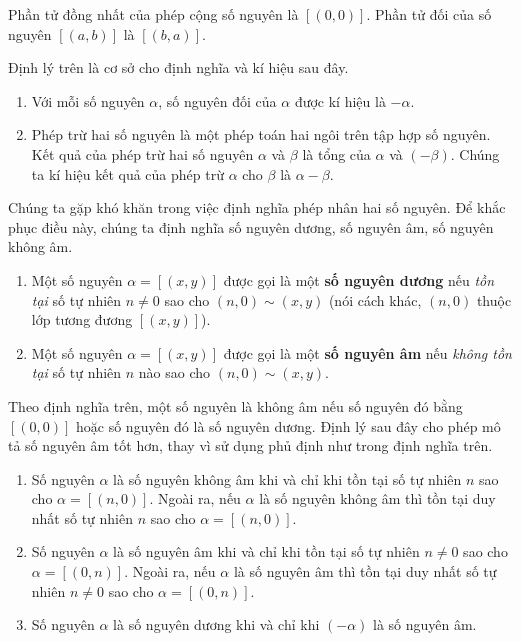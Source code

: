 Phần tử đồng nhất của phép cộng số nguyên là $[(0,0)]$. Phần tử đối của số nguyên $[(a, b)]$ là $[(b, a)]$.

Định lý trên là cơ sở cho định nghĩa và kí hiệu sau đây.
\begin{definition}
    \begin{enumerate}[label={(\roman*)}]
        \item Với mỗi số nguyên $\alpha$, số nguyên đối của $\alpha$ được kí hiệu là $-\alpha$.
        \item Phép trừ hai số nguyên là một phép toán hai ngôi trên tập hợp số nguyên. Kết quả của phép trừ hai số nguyên $\alpha$ và $\beta$ là tổng của $\alpha$ và $(-\beta)$. Chúng ta kí hiệu kết quả của phép trừ $\alpha$ cho $\beta$ là $\alpha - \beta$.
    \end{enumerate}
\end{definition}

Chúng ta gặp khó khăn trong việc định nghĩa phép nhân hai số nguyên. Để khắc phục điều này, chúng ta định nghĩa số nguyên dương, số nguyên âm, số nguyên không âm.
\begin{definition}
    \begin{enumerate}[label={(\roman*)}]
        \item Một số nguyên $\alpha = [(x, y)]$ được gọi là một \textbf{số nguyên dương} nếu \textit{tồn tại} số tự nhiên $n\ne 0$ sao cho $(n, 0)\sim (x, y)$ (nói cách khác, $(n, 0)$ thuộc lớp tương đương $[(x, y)]$).
        \item Một số nguyên $\alpha = [(x, y)]$ được gọi là một \textbf{số nguyên âm} nếu \textit{không tồn tại} số tự nhiên $n$ nào sao cho $(n, 0)\sim (x, y)$.
    \end{enumerate}
\end{definition}

Theo định nghĩa trên, một số nguyên là không âm nếu số nguyên đó bằng $[(0, 0)]$ hoặc số nguyên đó là số nguyên dương. Định lý sau đây cho phép mô tả số nguyên âm tốt hơn, thay vì sử dụng phủ định như trong định nghĩa trên.
\begin{theorem}\label{theorem:positive-negative-nonnegative-integers}
    \begin{enumerate}[label={(\roman*)}]
        \item Số nguyên $\alpha$ là số nguyên không âm khi và chỉ khi tồn tại số tự nhiên $n$ sao cho $\alpha = [(n, 0)]$. Ngoài ra, nếu $\alpha$ là số nguyên không âm thì tồn tại duy nhất số tự nhiên $n$ sao cho $\alpha = [(n, 0)]$.
        \item Số nguyên $\alpha$ là số nguyên âm khi và chỉ khi tồn tại số tự nhiên $n\ne 0$ sao cho $\alpha = [(0, n)]$. Ngoài ra, nếu $\alpha$ là số nguyên âm thì tồn tại duy nhất số tự nhiên $n\ne 0$ sao cho $\alpha = [(0, n)]$.
        \item Số nguyên $\alpha$ là số nguyên dương khi và chỉ khi $(-\alpha)$ là số nguyên âm.
    \end{enumerate}
\end{theorem}

